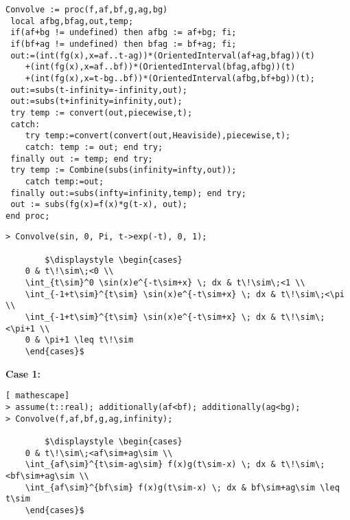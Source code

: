 \begin{lstlisting}[frame=single, mathescape]
Convolve := proc(f,af,bf,g,ag,bg)
 local afbg,bfag,out,temp;
 if(af+bg != undefined) then afbg := af+bg; fi;
 if(bf+ag != undefined) then bfag := bf+ag; fi;
 out:=(int(fg(x),x=af..t-ag))*(OrientedInterval(af+ag,bfag))(t)
    +(int(fg(x),x=af..bf))*(OrientedInterval(bfag,afbg))(t)
    +(int(fg(x),x=t-bg..bf))*(OrientedInterval(afbg,bf+bg))(t);
 out:=subs(t-infinity=-infinity,out);
 out:=subs(t+infinity=infinity,out);
 try temp := convert(out,piecewise,t);
 catch: 
    try temp:=convert(convert(out,Heaviside),piecewise,t);
    catch: temp := out; end try;  
 finally out := temp; end try;
 try temp := Combine(subs(infinity=infty,out));
    catch temp:=out;
 finally out:=subs(infty=infinity,temp); end try;
 out := subs(fg(x)=f(x)*g(t-x), out);
end proc;
\end{lstlisting}

\begin{mdframed}\begin{lstlisting}[mathescape]
> Convolve(sin, 0, Pi, t->exp(-t), 0, 1);

		$\displaystyle \begin{cases}
	0 & t\!\sim\;<0 \\
	\int_{t\sim}^0 \sin(x)e^{-t\sim+x} \; dx & t\!\sim\;<1 \\
	\int_{-1+t\sim}^{t\sim} \sin(x)e^{-t\sim+x} \; dx & t\!\sim\;<\pi \\
	\int_{-1+t\sim}^{t\sim} \sin(x)e^{-t\sim+x} \; dx & t\!\sim\;<\pi+1 \\
	0 & \pi+1 \leq t\!\sim
	\end{cases}$
\end{lstlisting}
\end{mdframed}

\textbf{Case 1:}

\begin{mdframed}\begin{lstlisting}[ mathescape]
> assume(t::real); additionally(af<bf); additionally(ag<bg);
> Convolve(f,af,bf,g,ag,infinity);

		$\displaystyle \begin{cases}
	0 & t\!\sim\;<af\sim+ag\sim \\
	\int_{af\sim}^{t\sim-ag\sim} f(x)g(t\sim-x) \; dx & t\!\sim\;<bf\sim+ag\sim \\
	\int_{af\sim}^{bf\sim} f(x)g(t\sim-x) \; dx & bf\sim+ag\sim \leq t\sim
	\end{cases}$
\end{lstlisting}
\end{mdframed}


